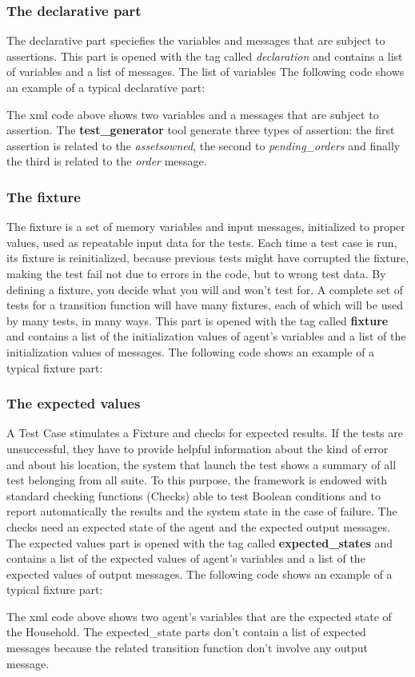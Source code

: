 \documentclass[a4paper,10pt]{article}
\begin{document}
\subsubsection{The declarative part}
The declarative part speciefies the variables and messages that are subject to assertions. This part is opened with the tag called \textit{declaration} and contains a list of variables and a list of messages. The list of variables 
The following code shows an example of a typical declarative part:

The xml code above shows two variables and a messages that are subject to assertion. The \textbf{test\_generator} tool generate three types of assertion: the first assertion is related to the \textit{assetsowned}, the second to \textit{pending\_orders } and finally the third is related to the \textit{order }message.
\subsubsection{The fixture}
The fixture is a set of memory variables and input messages, initialized to proper values, used
as repeatable input data for the tests. Each time a test case is run, its fixture is
reinitialized, because previous tests might have corrupted the fixture, making
the test fail not due to errors in the code, but to wrong test data. By defining
a fixture, you decide what you will and won’t test for. A complete set of tests
for a transition function  will have many fixtures, each of which will be used by many tests,
in many ways.
This part is opened with the tag called \textbf{fixture} and contains a  list of the initialization values of agent's variables and a list of the initialization values of messages.
The following code shows an example of a typical fixture part:

\subsubsection{The expected values}
A Test Case stimulates a Fixture and checks for expected
results. If the tests are unsuccessful, they have to provide helpful information
about the kind of error and about his location, the system that launch the test shows a summary of all test belonging from all suite. To this purpose,
the framework is endowed with standard checking functions (Checks)
able to test Boolean conditions and to report automatically the results
and the system state in the case of failure. 
The checks need an expected state of the agent and the expected output messages. The expected values part is opened with the tag called \textbf{expected\_states} and contains a  list of the expected values of agent's variables and a list of the expected values of output messages.
The following code shows an example of a typical fixture part: 

The xml code above shows two agent's variables that are the expected state of the Household. The expected\_state parts don't contain a list of expected messages because the related transition function don't involve any output message.
\end{document}
